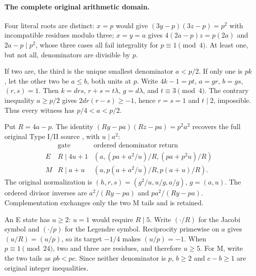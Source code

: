 \documentclass[11pt,reqno]{amsart}
\begin{document}
\paragraph{The complete original arithmetic domain.}
Four literal roots are distinct: $x=p$ would give
$(3y-p)(3z-p)=p^2$ with incompatible residues modulo three; $x=y=a$ gives
$4(2a-p)z=p(2a)$ and $2a-p\mid p^2$, whose three cases all fail integrality
for $p\equiv1\pmod4$. At least one, but not all, denominators are divisible
by $p$.

If two are, the third is the unique smallest denominator $a<p/2$. If only one
is $pk$, let the other two be $a\le b$, both units at $p$. Write
$4k-1=pt$, $a=gr$, $b=gs$, $(r,s)=1$. Then $k=drs$, $r+s=t\lambda$,
$g=d\lambda$, and $t\equiv3\pmod4$. The contrary inequality $a\ge p/2$
gives $2dr(r-s)\ge-1$, hence $r=s=1$ and $t\mid2$, impossible.
Thus every witness has $p/4<a<p/2$.

Put $R=4a-p$. The identity $(Ry-pa)(Rz-pa)=p^2a^2$ recovers the full original
Type I/II source \cite[\S2]{ET}, with $u\mid a^2$:
\[
\begin{array}{c|c|c}
&\text{gate}&\text{ordered denominator return}\\ \hline
E&R\mid4u+1&(a,(pa+a^2/u)/R,(pa+p^2u)/R)\\
M&R\mid a+u&(a,p(a+a^2/u)/R,p(a+u)/R).
\end{array}
\]
The original normalization is $(h,r,s)=(g^2/u,u/g,a/g)$, $g=(a,u)$.
The ordered divisor inverses are $a^2/(Ry-pa)$ and $pa^2/(Ry-pa)$.
Complementation exchanges only the two M tails and is retained.

An E state has $u\ge2$: $u=1$ would require $R\mid5$. Write $(\cdot/R)$ for
the Jacobi symbol and $(\cdot/p)$ for the Legendre symbol. Reciprocity
primewise on $a$ gives $(u/R)=(u/p)$, so its target $-1/4$ makes $(u/p)=-1$. When
$p\equiv1\pmod{24}$, two and three are residues, and therefore $u\ge5$.
For M, write the two tails as $pb<pc$. Since neither denominator is $p$,
$b\ge2$ and $c-b\ge1$ are original integer inequalities.
\end{document}
